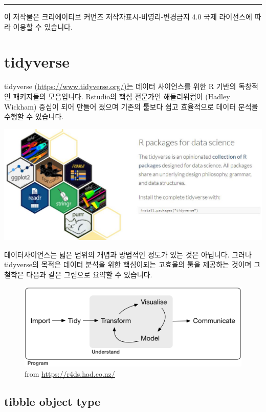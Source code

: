 \documentclass[
]{book}
\begin{document}
\begin{center}\rule{0.5\linewidth}{0.5pt}\end{center}

이 저작물은 크리에이티브 커먼즈 저작자표시-비영리-변경금지 4.0 국제 라이선스에 따라 이용할 수 있습니다.

\hypertarget{tidyverse}{%
\chapter{tidyverse}\label{tidyverse}}

tidyverse (\url{https://www.tidyverse.org/)는} 데이터 사이언스를 위한 R 기반의 독창적인 패키지들의 모음입니다. Rstudio의 핵심 전문가인 해들리위컴이 (Hadley Wickham) 중심이 되어 만들어 졌으며 기존의 툴보다 쉽고 효율적으로 데이터 분석을 수행할 수 있습니다.

\includegraphics[width=5.72917in,height=\textheight]{images/07/tidyverse.JPG}

데이터사이언스는 넓은 범위의 개념과 방법적인 정도가 있는 것은 아닙니다. 그러나 tidyverse의 목적은 데이터 분석을 위한 핵심이되는 고효율의 툴을 제공하는 것이며 그 철학은 다음과 같은 그림으로 요약할 수 있습니다.

\begin{figure}
\centering
\includegraphics{images/07/data-science.png}
\caption{from \url{https://r4ds.had.co.nz/}}
\end{figure}

\hypertarget{tibble-object-type}{%
\section{tibble object type}\label{tibble-object-type}}
\end{document}
